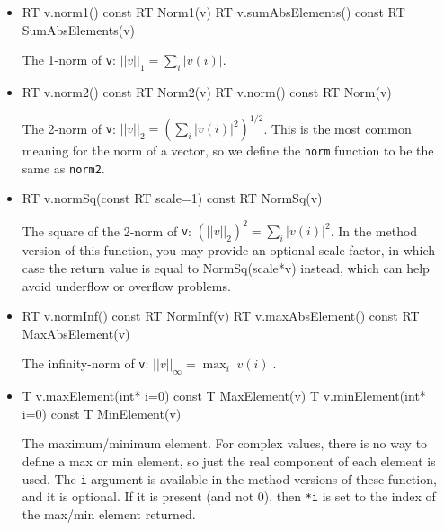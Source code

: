 \documentclass[twoside,letterpaper,11pt]{article}
\renewcommand{\tt}[1]{{\lstinline {#1}}}
\begin{document}
\begin{itemize}

\item
\begin{tmvcode}
RT v.norm1() const
RT Norm1(v)
RT v.sumAbsElements() const
RT SumAbsElements(v)
\end{tmvcode}
The 1-norm of \tt{v}: $||v||_1 = \sum_i |v(i)|$.

\item
\begin{tmvcode}
RT v.norm2() const
RT Norm2(v)
RT v.norm() const
RT Norm(v)
\end{tmvcode}
The 2-norm of \tt{v}: $||v||_2 = (\sum_i |v(i)|^2)^{1/2}$.
This is the most common meaning for the norm of a vector, so we
define the \tt{norm} function to be the same as \tt{norm2}.

\item
\begin{tmvcode}
RT v.normSq(const RT scale=1) const
RT NormSq(v)
\end{tmvcode}
The square of the 2-norm of \tt{v}: $(||v||_2)^2 = \sum_i |v(i)|^2$.
In the method version of this function, you may provide an optional scale factor,
in which case the return value is equal to NormSq(scale*v) instead, 
which can help avoid underflow or overflow problems.

\item
\begin{tmvcode}
RT v.normInf() const
RT NormInf(v)
RT v.maxAbsElement() const
RT MaxAbsElement(v)
\end{tmvcode}
The infinity-norm of \tt{v}: $||v||_\infty = \max_i |v(i)|$.

\item
\begin{tmvcode}
T v.maxElement(int* i=0) const
T MaxElement(v)
T v.minElement(int* i=0) const
T MinElement(v)
\end{tmvcode}
The maximum/minimum element.  For complex values, there is no way to define a 
max or min element, so just the real component of each element is used.
The \tt{i} argument is available in the method versions of these function, and it is optional.
If it is present (and not 0), then \tt{*i} is set to the 
index of the max/min element returned.


\end{itemize}
\end{document}
